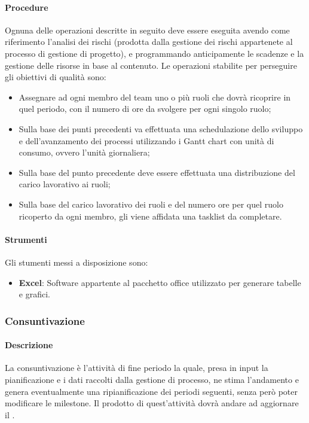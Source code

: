 \documentclass[../NormeDiProgetto_v4.0.0.tex]{subfiles}
\begin{document}
			\paragraph{Procedure}
				Ognuna delle operazioni descritte in seguito deve essere eseguita avendo come riferimento l'analisi dei rischi (prodotta dalla gestione dei rischi appartenete al processo di gestione di progetto), e programmando anticipamente le scadenze e la gestione delle risorse in base al contenuto.
				Le operazioni stabilite per perseguire gli obiettivi di qualità sono:
				\begin{itemize}
					\item Assegnare ad ogni membro del team uno o più ruoli che dovrà ricoprire in quel periodo, con il numero di ore da svolgere per ogni singolo ruolo;
					\item Sulla base dei punti precedenti va effettuata una schedulazione dello sviluppo e dell'avanzamento dei processi utilizzando i Gantt chart con unità di consumo, ovvero l'unità giornaliera;
					\item Sulla base del punto precedente deve essere effettuata una distribuzione del carico lavorativo ai ruoli;
					\item Sulla base del carico lavorativo dei ruoli e del numero ore per quel ruolo ricoperto da ogni membro, gli viene affidata una tasklist da completare.
				\end{itemize}

			\paragraph{Strumenti}
				Gli stumenti messi a disposizione sono:
				\begin{itemize}
					\item \textbf{Excel}: Software appartente al pacchetto office utilizzato per generare tabelle e grafici. 
				\end{itemize}
				

		\subsubsection{Consuntivazione}
			\paragraph{Descrizione}
				La consuntivazione è l'attività di fine periodo la quale, presa in input la pianificazione e i dati raccolti dalla gestione di processo, ne stima l'andamento e genera eventualmente una ripianificazione dei periodi seguenti, senza però poter modificare le milestone.
				Il prodotto di quest'attività dovrà andare ad aggiornare il \pianodiprogetto.
\end{document}
